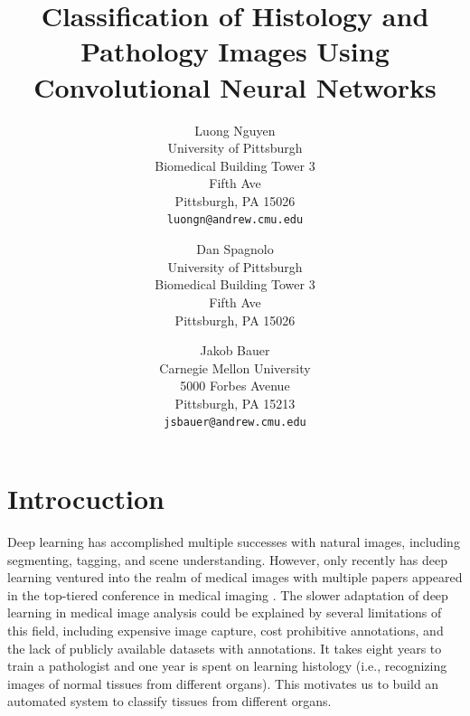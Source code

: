 \documentclass[10pt,twocolumn,letterpaper]{article}
\begin{document}
\title
{
    Classification of Histology and Pathology Images Using Convolutional Neural
    Networks%
}

\author{%
    Luong Nguyen\\
    University of Pittsburgh\\
    Biomedical Building Tower 3\\
    Fifth Ave\\
    Pittsburgh, PA 15026\\
    {\tt\small luongn@andrew.cmu.edu}
    \and
    Dan Spagnolo\\
    University of Pittsburgh\\
    Biomedical Building Tower 3\\
    Fifth Ave\\
    Pittsburgh, PA 15026\\
    \and
    Jakob Bauer\\
    Carnegie Mellon University\\
    5000 Forbes Avenue\\
    Pittsburgh, PA 15213\\
    {\tt\small jsbauer@andrew.cmu.edu}
}

\maketitle




\section{Introcuction}
\label{sec:Introcuction}

Deep learning has accomplished multiple successes with natural images,
including segmenting, tagging, and scene understanding. However, only
recently has deep learning ventured into the realm of medical images with
multiple papers appeared in the top-tiered conference in medical imaging
\cite{cruz2013deep,roth2015deeporgan}.
The slower adaptation of deep learning in medical image analysis
could be explained by several limitations of this field, including expensive
image capture, cost prohibitive annotations, and the lack of publicly
available datasets with annotations. It takes eight years to train a
pathologist and one year is spent on learning histology (i.e., recognizing
images of normal tissues from different organs). This motivates us to build
an automated system to classify tissues from different organs.
\end{document}
